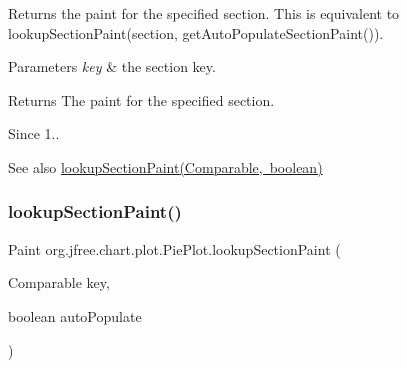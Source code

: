 Returns the paint for the specified section. This is equivalent to {\ttfamily lookup\+Section\+Paint(section, get\+Auto\+Populate\+Section\+Paint())}.


\begin{DoxyParams}{Parameters}
{\em key} & the section key.\\
\hline
\end{DoxyParams}
\begin{DoxyReturn}{Returns}
The paint for the specified section.
\end{DoxyReturn}
\begin{DoxySince}{Since}
1..
\end{DoxySince}
\begin{DoxySeeAlso}{See also}
\mbox{\hyperlink{classorg_1_1jfree_1_1chart_1_1plot_1_1_pie_plot_a357b84f6fadc1271562d3b64f40eeabe}{lookup\+Section\+Paint(\+Comparable, boolean)}} 
\end{DoxySeeAlso}
\mbox{\label{classorg_1_1jfree_1_1chart_1_1plot_1_1_pie_plot_a357b84f6fadc1271562d3b64f40eeabe}} 
\subsubsection{\texorpdfstring{lookup\+Section\+Paint()}{lookupSectionPaint()}\hspace{0.1cm}{\footnotesize\ttfamily [2/3]}}
{\footnotesize\ttfamily Paint org.\+jfree.\+chart.\+plot.\+Pie\+Plot.\+lookup\+Section\+Paint (\begin{DoxyParamCaption}\item[{Comparable}]{key,  }\item[{boolean}]{auto\+Populate }\end{DoxyParamCaption})\hspace{0.3cm}{\ttfamily [protected]}}

